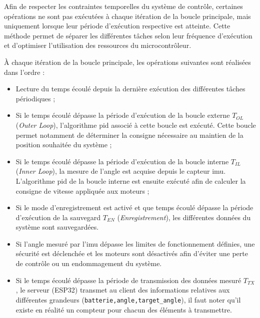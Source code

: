 Afin de respecter les contraintes temporelles du système de contrôle, certaines opérations ne sont pas exécutées à chaque itération de la boucle principale, mais uniquement lorsque leur période d'exécution respective est atteinte. Cette méthode permet de séparer les différentes tâches selon leur fréquence d'exécution et d'optimiser l'utilisation des ressources du microcontrôleur.

À chaque itération de la boucle principale, les opérations suivantes sont réalisées dans l'ordre :

\begin{itemize}
    \item Lecture du temps écoulé depuis la dernière exécution des différentes tâches périodiques ;
    
    \item Si le temps écoulé dépasse la période d'exécution de la boucle externe $T_{OL}$ (\textit{Outer Loop}), l'algorithme \acrshort{pid} associé à cette boucle est exécuté. Cette boucle permet notamment de déterminer la consigne nécessaire au maintien de la position souhaitée du système ;
    
    \item Si le temps écoulé dépasse la période d'exécution de la boucle interne $T_{IL}$ (\textit{Inner Loop}), la mesure de l'angle est acquise depuis le capteur \acrshort{imu}. L'algorithme \acrshort{pid} de la boucle interne est ensuite exécuté afin de calculer la consigne de vitesse appliquée aux moteurs ;
    
    \item Si le mode d'enregistrement est activé et que temps écoulé dépasse la période d'exécution de la sauvegard $T_{EN}$ (\textit{Enregistrement}), les différentes données du système sont sauvegardées.
    
    \item Si l'angle mesuré par l'\acrshort{imu} dépasse les limites de fonctionnement définies, une sécurité est déclenchée et les moteurs sont désactivés afin d'éviter une perte de contrôle ou un endommagement du système.

    \item Si le temps écoulé dépasse la période de transmission des données mesuré $T_{TX}$, le serveur (ESP32) transmet au client des informations relatives aux différentes grandeurs (\texttt{batterie,angle,target\_angle}), il faut noter qu'il existe en réalité un compteur pour chacun des éléments à transmettre.

\end{itemize}

